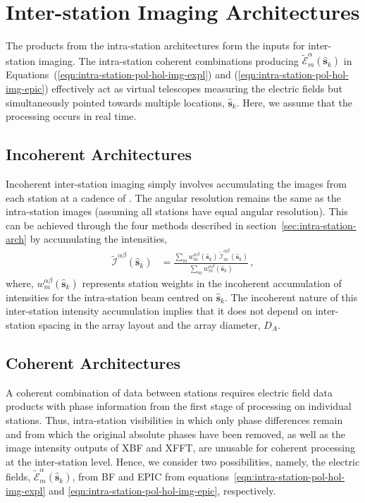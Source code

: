 \documentclass[
  journal=pasa,
  manuscript=article-type,
  year=2020,
  volume=37,
]{cup-journal}
\begin{document}
\section{Inter-station Imaging Architectures} \label{sec:inter-station-arch}

The products from the intra-station architectures form the inputs for inter-station imaging. The intra-station coherent combinations producing $\widetilde{\mathcal{E}}_m^\alpha(\hat{\boldsymbol{s}}_k)$ in Equations~(\ref{eqn:intra-station-pol-hol-img-expl}) and (\ref{eqn:intra-station-pol-hol-img-epic}) effectively act as virtual telescopes measuring the electric fields but simultaneously pointed towards multiple locations, $\hat{\boldsymbol{s}}_k$. Here, we assume that the processing occurs in real time. 

\subsection{Incoherent Architectures} \label{sec:incoherent}

Incoherent inter-station imaging simply involves accumulating the images from each station at a cadence of . The angular resolution remains the same as the intra-station images (assuming all stations have equal angular resolution). This can be achieved through the four methods described in section~\ref{sec:intra-station-arch} by accumulating the intensities, 
\begin{align}
    \widetilde{\mathcal{I}}^{\alpha\beta}(\hat{\boldsymbol{s}}_k) &= \frac{\sum_m w_{m}^{\alpha\beta}(\hat{\boldsymbol{s}}_k) \, \widetilde{\mathcal{I}}_m^{\alpha\beta}(\hat{\boldsymbol{s}}_k)}{\sum_m w_{m}^{\alpha\beta}(\hat{\boldsymbol{s}}_k)} \, , \label{eqn:inter-station-incoherent-pol-images}
\end{align}
where, $w_{m}^{\alpha\beta}(\hat{\boldsymbol{s}}_k)$ represents station weights in the incoherent accumulation of intensities for the intra-station beam centred on $\hat{\boldsymbol{s}}_k$. The incoherent nature of this inter-station intensity accumulation implies that it does not depend on inter-station spacing in the array layout and the array diameter, $D_A$. 

\subsection{Coherent Architectures} \label{sec:coherent}

A coherent combination of data between stations requires electric field data products with phase information from the first stage of processing on individual stations. Thus, intra-station visibilities in which only phase differences remain and from which the original absolute phases have been removed, as well as the image intensity outputs of XBF and XFFT, are unusable for coherent processing at the inter-station level. Hence, we consider two possibilities, namely, the electric fields, $\widetilde{\mathcal{E}}_m^\alpha(\hat{\boldsymbol{s}}_k)$, from BF and EPIC from equations~\ref{eqn:intra-station-pol-hol-img-expl} and \ref{eqn:intra-station-pol-hol-img-epic},
respectively. 
\end{document}
